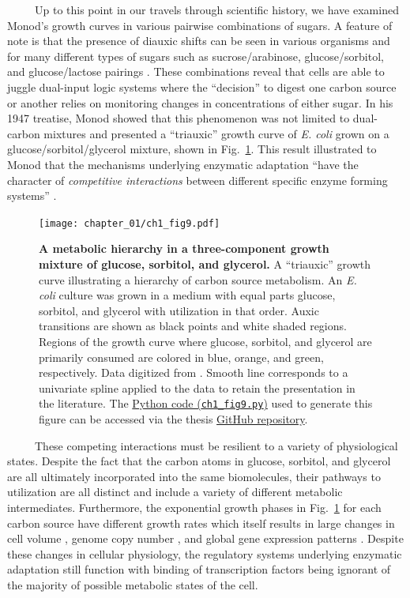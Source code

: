 \documentclass[12pt]{caltech_thesis}
\begin{document}
~~~~~Up to this point in our travels through scientific history, we have
examined Monod's growth curves in various pairwise combinations of
sugars. A feature of note is that the presence of diauxic shifts can be
seen in various organisms and for many different types of sugars such as
sucrose/arabinose, glucose/sorbitol, and glucose/lactose pairings
\autocite{monod1947}. These combinations reveal that cells are able to
juggle dual-input logic systems where the ``decision'' to digest one
carbon source or another relies on monitoring changes in concentrations
of either sugar. In his 1947 treatise, Monod showed that this phenomenon
was not limited to dual-carbon mixtures and presented a ``triauxic''
growth curve of \emph{E. coli} grown on a glucose/sorbitol/glycerol
mixture, shown in Fig.~\ref{fig:triauxic_growth}. This result
illustrated to Monod that the mechanisms underlying enzymatic adaptation
``have the character of \emph{competitive interactions} between
different specific enzyme forming systems'' \autocite{monod1947}.

\hypertarget{fig:triauxic_growth}{%
\begin{figure}
\centering
\texttt{[image: chapter\_01/ch1\_fig9.pdf]}
\caption[{A metabolic hierarchy in a growth medium containing glucose,
sorbitol, and glycerol.}]{\textbf{A metabolic hierarchy in a
three-component growth mixture of glucose, sorbitol, and glycerol.} A
``triauxic'' growth curve illustrating a hierarchy of carbon source
metabolism. An \emph{E. coli} culture was grown in a medium with equal
parts glucose, sorbitol, and glycerol with utilization in that order.
Auxic transitions are shown as black points and white shaded regions.
Regions of the growth curve where glucose, sorbitol, and glycerol are
primarily consumed are colored in blue, orange, and green, respectively.
Data digitized from \textcite{monod1947}. Smooth line corresponds to a
univariate spline applied to the data to retain the presentation in the
literature. The
\href{https://github.com/gchure/phd/blob/master/src/chapter_01/code/ch1_fig9.py}{Python
code (\texttt{ch1\_fig9.py})} used to generate this figure can be
accessed via the thesis \href{https://github.com/gchure/phd}{GitHub
repository}.}
\label{fig:triauxic_growth}
\end{figure}
}

~~~~~These competing interactions must be resilient to a variety of
physiological states. Despite the fact that the carbon atoms in glucose,
sorbitol, and glycerol are all ultimately incorporated into the same
biomolecules, their pathways to utilization are all distinct and include
a variety of different metabolic intermediates. Furthermore, the
exponential growth phases in Fig.~\ref{fig:triauxic_growth} for each
carbon source have different growth rates which itself results in large
changes in cell volume \autocite{taheri-araghi2015,jun2018}, genome copy
number \autocite{nordstrom2006}, and global gene expression patterns
\autocite{li2014,schmidt2016,hui2015}. Despite these changes in cellular
physiology, the regulatory systems underlying enzymatic adaptation still
function with binding of transcription factors being ignorant of the
majority of possible metabolic states of the cell.
\end{document}
